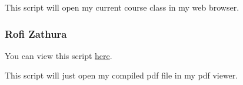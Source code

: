 This script will open my current course class in my web browser.


\subsubsection{Rofi Zathura}
\label{sub_sub_sec:rofi_zathura}

You can view this script
\hyperlink{https://github.com/SingularisArt/local/blob/master/scripts/school/rofi-zathura.sh}{here}.

This script will just open my compiled pdf file in my pdf viewer.




\newpage
